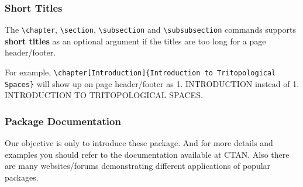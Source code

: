 \documentclass{article}
\begin{document}
\subsubsection{Short Titles}
	The \texttt{\textbackslash chapter}, \texttt{\textbackslash section}, \texttt{\textbackslash subsection} and \texttt{\textbackslash subsubsection} commands supports \textbf{short titles} as an optional argument if the titles are too long for a page header/footer.
	
	For example, \texttt{\textbackslash chapter[Introduction]\{Introduction to Tritopological Spaces\}} will show up on page header/footer as 1. INTRODUCTION instead of 1. INTRODUCTION TO TRITOPOLOGICAL SPACES.

\subsubsection{Package Documentation}
	Our objective is only to introduce these package. And for more details and examples you should refer to the documentation available at CTAN. Also there are many websites/forums demonstrating different applications of popular packages.
\end{document}
